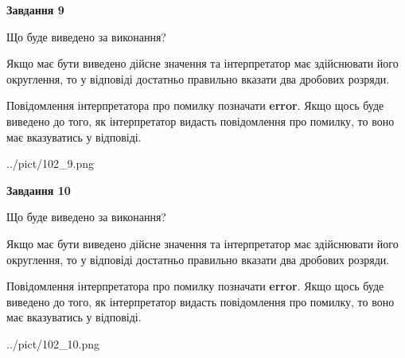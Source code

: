 \documentclass[12pt, ukrainian]{article}
\begin{document}
{\begin {Large}
{\begin {center}\textbf{Завдання 9}\end {center}}\par
Що буде виведено за виконання? \par

Якщо має бути виведено дійсне значення та інтерпретатор має здійснювати його округлення, 
то у відповіді достатньо правильно вказати два дробових розряди.

Повідомлення інтерпретатора про помилку позначати \textbf{error}.
Якщо щось буде виведено до того, як інтерпретатор видасть повідомлення про помилку, 
то воно має вказуватись у відповіді. \par

\begin{center}
	{../pict/102_9.png}
\end{center}
\newpage

{\begin {center}\textbf{Завдання 10}\end {center}}\par
Що буде виведено за виконання? \par

Якщо має бути виведено дійсне значення та інтерпретатор має здійснювати його округлення, 
то у відповіді достатньо правильно вказати два дробових розряди.

Повідомлення інтерпретатора про помилку позначати \textbf{error}.
Якщо щось буде виведено до того, як інтерпретатор видасть повідомлення про помилку, 
то воно має вказуватись у відповіді. \par

\begin{center}
	{../pict/102_10.png}
\end{center}
\newpage

\end {Large}}
\end{document}
